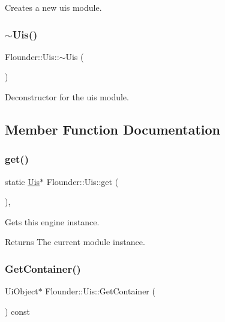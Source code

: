 Creates a new uis module. 

\mbox{\label{class_flounder_1_1_uis_a2b36cc1c0c8da3a21344c61e00481eb8}} 
\subsubsection{\texorpdfstring{$\sim$\+Uis()}{~Uis()}}
{\footnotesize\ttfamily Flounder\+::\+Uis\+::$\sim$\+Uis (\begin{DoxyParamCaption}{ }\end{DoxyParamCaption})}



Deconstructor for the uis module. 



\subsection{Member Function Documentation}
\mbox{\label{class_flounder_1_1_uis_a39f0bcd8df0227164cd422e678cc8a58}} 
\subsubsection{\texorpdfstring{get()}{get()}}
{\footnotesize\ttfamily static \hyperlink{class_flounder_1_1_uis}{Uis}$\ast$ Flounder\+::\+Uis\+::get (\begin{DoxyParamCaption}{ }\end{DoxyParamCaption})\hspace{0.3cm}{\ttfamily [inline]}, {\ttfamily [static]}}



Gets this engine instance. 

\begin{DoxyReturn}{Returns}
The current module instance. 
\end{DoxyReturn}
\mbox{\label{class_flounder_1_1_uis_a2b570c5016d66eff53caaf9df9af3b06}} 
\subsubsection{\texorpdfstring{Get\+Container()}{GetContainer()}}
{\footnotesize\ttfamily Ui\+Object$\ast$ Flounder\+::\+Uis\+::\+Get\+Container (\begin{DoxyParamCaption}{ }\end{DoxyParamCaption}) const\hspace{0.3cm}{\ttfamily [inline]}}



